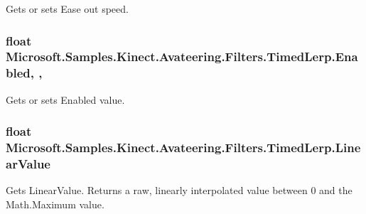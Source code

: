 Gets or sets Ease out speed. 

\hypertarget{class_microsoft_1_1_samples_1_1_kinect_1_1_avateering_1_1_filters_1_1_timed_lerp_ab64a8022d62f23eae5f19239dd734b1a}{
\subsubsection[{Enabled}]{\setlength{\rightskip}{0pt plus 5cm}float Microsoft.\+Samples.\+Kinect.\+Avateering.\+Filters.\+Timed\+Lerp.\+Enabled\hspace{0.3cm}{\ttfamily [get]}, {\ttfamily [set]}, {\ttfamily [protected]}}}\label{class_microsoft_1_1_samples_1_1_kinect_1_1_avateering_1_1_filters_1_1_timed_lerp_ab64a8022d62f23eae5f19239dd734b1a}


Gets or sets Enabled value. 

\hypertarget{class_microsoft_1_1_samples_1_1_kinect_1_1_avateering_1_1_filters_1_1_timed_lerp_a3b40018bedff53d1fcbb9846819546a9}{
\subsubsection[{Linear\+Value}]{\setlength{\rightskip}{0pt plus 5cm}float Microsoft.\+Samples.\+Kinect.\+Avateering.\+Filters.\+Timed\+Lerp.\+Linear\+Value\hspace{0.3cm}{\ttfamily [get]}}}\label{class_microsoft_1_1_samples_1_1_kinect_1_1_avateering_1_1_filters_1_1_timed_lerp_a3b40018bedff53d1fcbb9846819546a9}


Gets Linear\+Value. Returns a raw, linearly interpolated value between 0 and the Math.\+Maximum value. 

